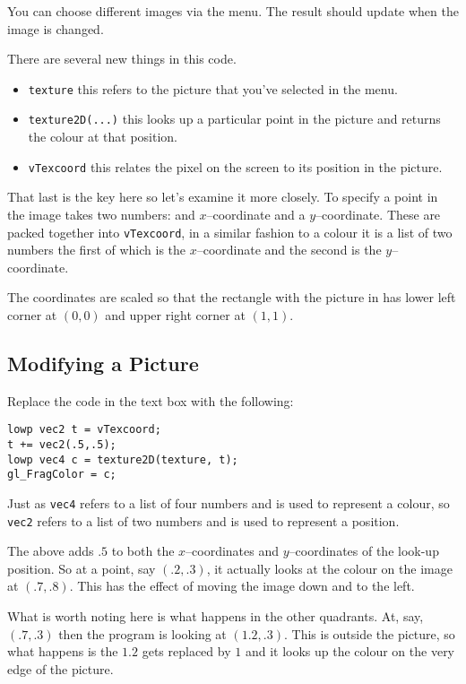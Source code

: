 \documentclass[
  html5,%
  mathml,%
  use filename%
]{internet}
\begin{document}
You can choose different images via the menu.
The result should update when the image is changed.

There are several new things in this code.

\begin{itemize}
\item \verb+texture+ this refers to the picture that you've selected in the menu.
\item \verb+texture2D(...)+ this looks up a particular point in the picture and returns the colour at that position.
\item \verb+vTexcoord+ this relates the pixel on the screen to its position in the picture.
\end{itemize}

That last is the key here so let's examine it more closely.
To specify a point in the image takes two numbers: and \(x\)--coordinate and a \(y\)--coordinate.
These are packed together into \verb+vTexcoord+, in a similar fashion to a colour it is a list of two numbers the first of which is the \(x\)--coordinate and the second is the \(y\)--coordinate.

The coordinates are scaled so that the rectangle with the picture in has lower left corner at \((0,0)\) and upper right corner at \((1,1)\).

\subsection{Modifying a Picture}

Replace the code in the text box with the following:

\begin{tcolorbox}
\begin{verbatim}
lowp vec2 t = vTexcoord;
t += vec2(.5,.5);
lowp vec4 c = texture2D(texture, t);
gl_FragColor = c;
\end{verbatim}
\end{tcolorbox}

Just as \verb+vec4+ refers to a list of four numbers and is used to represent a colour, so \verb+vec2+ refers to a list of two numbers and is used to represent a position.

The above adds \(.5\) to both the \(x\)--coordinates and \(y\)--coordinates of the look-up position.
So at a point, say \((.2,.3)\), it actually looks at the colour on the image at \((.7,.8)\).
This has the effect of moving the image down and to the left.

What is worth noting here is what happens in the other quadrants.
At, say, \((.7,.3)\) then the program is looking at \((1.2,.3)\).
This is outside the picture, so what happens is the \(1.2\) gets replaced by \(1\) and it looks up the colour on the very edge of the picture.
\end{document}

